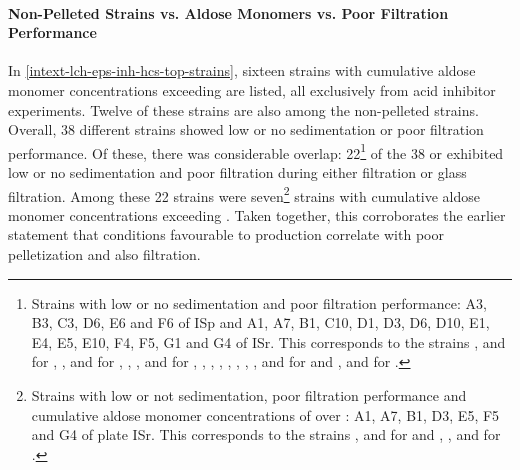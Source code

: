 \paragraph{Non-Pelleted Strains vs. \EPS{} Aldose Monomers vs. Poor Filtration Performance}
In \vref{intext-lch-eps-inh-hcs-top-strains}, sixteen strains with cumulative \eps{} aldose monomer concentrations exceeding  are listed, all exclusively from acid inhibitor experiments. Twelve of these strains are also among the non-pelleted strains. Overall, 38 different strains showed low or no sedimentation or poor filtration performance. Of these, there was considerable overlap: 22\footnote{
Strains with low or no sedimentation and poor filtration performance: A3, B3, C3, D6, E6 and F6 of ISp and A1, A7, B1, C10, D1, D3, D6, D10, E1, E4, E5, E10, F4, F5, G1 and G4 of ISr. This corresponds to the strains 
,  and  for \fur{},
,  and  for \hmf{},
, ,  and  for \acet{},
, , , , , , ,  and  for \fora{} and
,  and  for \laev{}.
} of the 38 or  exhibited low or no sedimentation and poor filtration during either  filtration or glass filtration. Among these 22 strains were seven\footnote{
Strains with low or not sedimentation, poor filtration performance and cumulative \eps{} aldose monomer concentrations of over : A1, A7, B1, D3, E5, F5 and G4 of plate ISr. This corresponds to the strains ,  and  for \acet{} and , ,  and  for \fora{}.
} strains with cumulative \eps{} aldose monomer concentrations exceeding . Taken together, this corroborates the earlier statement that conditions favourable to \eps{} production correlate with poor pelletization and also filtration.

